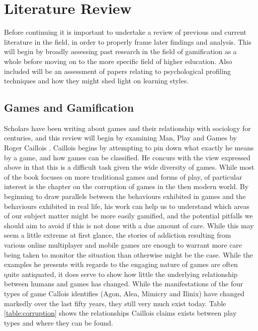 \documentclass[12pt,a4paper,twoside]{report}
\begin{document}
\chapter{Literature Review}
Before continuing it is important to undertake a review of previous and current literature in the field, in order to properly frame later findings and analysis. This will begin by broadly assessing past research in the field of gamification as a whole before moving on to the more specific field of higher education. Also included will be an assessment of papers relating to psychological profiling techniques and how they might shed light on learning styles.

\section{Games and Gamification}
Scholars have been writing about games and their relationship with sociology for centuries, and this review will begin by examining Man, Play and Games by Roger Caillois \cite{caillois1961man}. Caillois begins by attempting to pin down what exactly he means by a game, and how games can be classified. He concurs with the view expressed above in that this is a difficult task given the wide diversity of games. While most of the book focuses on more traditional games and forms of play, of particular interest is the chapter on the corruption of games in the then modern world. By beginning to draw parallels between the behaviours exhibited in games and the behaviours exhibited in real life, his work can help us to understand which areas of our subject matter might be more easily gamified, and the potential pitfalls we should aim to avoid if this is not done with a due amount of care. While this may seem a little extreme at first glance, the stories of addiction resulting from various online multiplayer and mobile games are enough to warrant more care being taken to monitor the situation than otherwise might be the case. While the examples he presents with regards to the engaging nature of games are often quite antiquated, it does serve to show how little the underlying relationship between humans and games has changed. While the manifestations of the four types of game Callois identifies (Agon, Alea, Mimicry and Ilinix) have changed markedly over the last fifty years, they still very much exist today. Table \ref{table:corruption} shows the relationships Caillois claims exists between play types and where they can be found.
\end{document}
